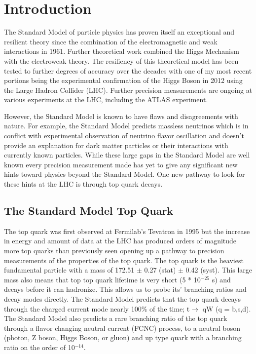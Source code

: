 \newpage
\section{Introduction}
\label{sec:intro}

The Standard Model of particle physics has proven itself an exceptional and resilient theory since the combination of the electromagnetic and weak interactions in 1961\cite{SM1Glashow}.  Further theoretical work combined the Higgs Mechanism\cite{Higgs1,Higgs2} with the electroweak theory\cite{SM2Weinberg, SM3Salam}.  The resiliency of this theoretical model has been tested to further degrees of accuracy over the decades with one of my most recent portions being the experimental confirmation of the Higgs Boson in 2012\cite{Higgs3,Higgs4} using the Large Hadron Collider (LHC).  Further precision measurements are ongoing at various experiments at the LHC, including the ATLAS experiment.

However, the Standard Model is known to have flaws and disagreements with nature.  For example, the Standard Model predicts massless neutrinos which is in conflict with experimental observation of neutrino flavor oscillation and doesn't provide an explanation for dark matter particles or their interactions with currently known particles.  While these large gaps in the Standard Model are well known every precision measurement made has yet to give any significant new hints toward physics beyond the Standard Model.  One new pathway to look for these hints at the LHC is through top quark decays.

\subsection{The Standard Model Top Quark}
The top quark was first observed at Fermilab's Tevatron in 1995\cite{TopObs} but the increase in energy and amount of data at the LHC has produced orders of magnitude more top quarks than previously seen opening up a pathway to precision measurements of the properties of the top quark.  The top quark is the heaviest fundamental particle with a mass of 172.51 $\pm$ 0.27 (stat) $\pm$ 0.42 (syst)\cite{TopMass2017}.  This large mass also means that top top quark lifetime is very short (5 * 10$^{-25}$ s) and decays before it can hadronize.  This allows us to probe its' branching ratios and decay modes directly.  The Standard Model predicts that the top quark decays through the charged current mode nearly 100\% of the time; t$\rightarrow$ qW (q = b,s,d)\cite{PDG2018}.   The Standard Model also predicts a rare branching ratio of the top quark through a flavor changing neutral current (FCNC) process, to a neutral boson (photon, Z boson, Higgs Boson, or gluon) and up type quark with a branching ratio on the order of 10$^{-14}$.


